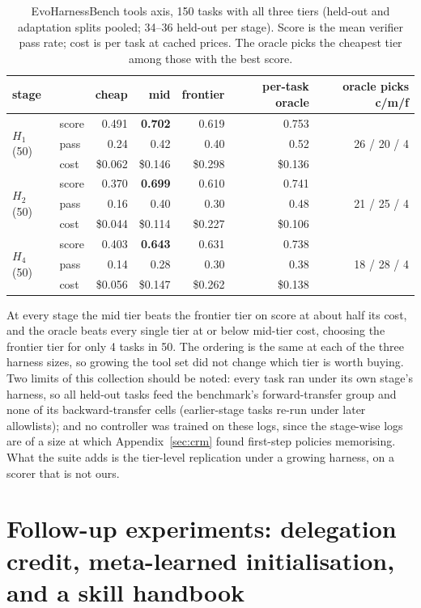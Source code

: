 \documentclass[10pt]{article}
\begin{document}
\begin{table}[htbp]\centering\small
\begin{tabular}{llrrrrr}\toprule
stage & & cheap & mid & frontier & per-task oracle & oracle picks c/m/f \\\midrule
\multirow{3}{*}{$H_1$ (50)} & score & 0.491 & \textbf{0.702} & 0.619 & 0.753 & \multirow{3}{*}{26 / 20 / 4} \\
& pass & 0.24 & 0.42 & 0.40 & 0.52 & \\
& cost & \$0.062 & \$0.146 & \$0.298 & \$0.136 & \\\midrule
\multirow{3}{*}{$H_2$ (50)} & score & 0.370 & \textbf{0.699} & 0.610 & 0.741 & \multirow{3}{*}{21 / 25 / 4} \\
& pass & 0.16 & 0.40 & 0.30 & 0.48 & \\
& cost & \$0.044 & \$0.114 & \$0.227 & \$0.106 & \\\midrule
\multirow{3}{*}{$H_4$ (50)} & score & 0.403 & \textbf{0.643} & 0.631 & 0.738 & \multirow{3}{*}{18 / 28 / 4} \\
& pass & 0.14 & 0.28 & 0.30 & 0.38 & \\
& cost & \$0.056 & \$0.147 & \$0.262 & \$0.138 & \\\bottomrule
\end{tabular}
\caption{EvoHarnessBench tools axis, 150 tasks with all three tiers (held-out and adaptation splits pooled; 34--36 held-out per stage). Score is the mean verifier pass rate; cost is per task at cached prices. The oracle picks the cheapest tier among those with the best score.}
\label{tab:evoharness}
\end{table}

At every stage the mid tier beats the frontier tier on score at about half its cost, and the oracle beats every single tier at or below mid-tier cost, choosing the frontier tier for only 4 tasks in 50. The ordering is the same at each of the three harness sizes, so growing the tool set did not change which tier is worth buying. Two limits of this collection should be noted: every task ran under its own stage's harness, so all held-out tasks feed the benchmark's forward-transfer group and none of its backward-transfer cells (earlier-stage tasks re-run under later allowlists); and no controller was trained on these logs, since the stage-wise logs are of a size at which Appendix~\ref{sec:crm} found first-step policies memorising. What the suite adds is the tier-level replication under a growing harness, on a scorer that is not ours.

\section{Follow-up experiments: delegation credit, meta-learned initialisation, and a skill handbook}
\label{sec:followups}
\end{document}
